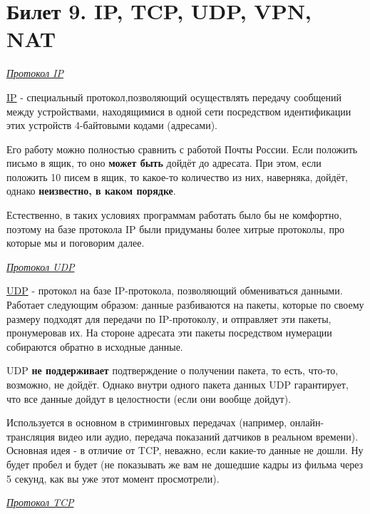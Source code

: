 \newpage
\section {Билет 9. IP, TCP, UDP, VPN, NAT}

\begin{center}
	\textit{\underline{Протокол IP}}
\end{center}

\href{https://ru.wikipedia.org/wiki/IP}{IP} - специальный протокол,позволяющий осуществлять передачу сообщений между устройствами, находящимися в одной сети посредством идентификации этих устройств 4-байтовыми кодами (адресами).

Его работу можно полностью сравнить с работой Почты России. Если положить письмо в ящик, то оно \textbf{может быть} дойдёт до адресата. При этом, если положить 10 писем в ящик, то какое-то количество из них, наверняка, дойдёт, однако \textbf{неизвестно, в каком порядке}.

Естественно, в таких условиях программам работать было бы не комфортно, поэтому на базе протокола IP были придуманы более хитрые протоколы, про которые мы и поговорим далее.

\begin{center}
	\textit{\underline{Протокол UDP}}
\end{center}

\href{https://ru.wikipedia.org/wiki/UDP}{UDP} - протокол на базе IP-протокола, позволяющий обмениваться данными. Работает следующим образом: данные разбиваются на пакеты, которые по своему размеру подходят для передачи по IP-протоколу, и отправляет эти пакеты, пронумеровав их. На стороне адресата эти пакеты посредством нумерации собираются обратно в исходные данные.

UDP \textbf{не поддерживает} подтверждение о получении пакета, то есть, что-то, возможно, не дойдёт. Однако внутри одного пакета данных UDP гарантирует, что все данные дойдут в целостности (если они вообще дойдут).

Используется в основном в стриминговых передачах (например, онлайн-трансляция видео или аудио, передача показаний датчиков в реальном времени). Основная идея - в отличие от TCP, неважно, если какие-то данные не дошли. Ну будет пробел и будет (не показывать же вам не дошедшие кадры из фильма через 5 секунд, как вы уже этот момент просмотрели).

\begin{center}
	\textit{\underline{Протокол TCP}}
\end{center}

